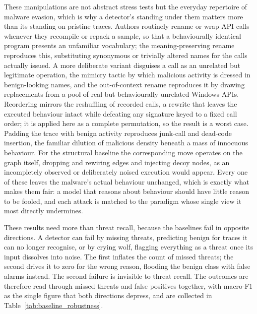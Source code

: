 \documentclass[%
    BCOR=10mm,
    DIV=13,
    toc=bibliography,
    toc=listof,
    oneside,
    12pt,
]{scrbook}
\begin{document}
These manipulations are not abstract stress tests but the everyday repertoire of malware
evasion, which is why a detector's standing under them matters more than its
standing on pristine traces. Authors routinely rename or wrap API calls whenever
they recompile or repack a sample, so that a behaviourally identical program
presents an unfamiliar vocabulary; the meaning-preserving rename reproduces this,
substituting synonymous or trivially altered names for the calls actually issued.
A more deliberate variant disguises a call as an unrelated but legitimate
operation, the mimicry tactic by which malicious activity is dressed in
benign-looking names, and the out-of-context rename reproduces it by drawing
replacements from a pool of real but behaviourally unrelated Windows APIs.
Reordering mirrors the reshuffling of recorded calls, a rewrite that leaves the
executed behaviour intact while defeating any signature keyed to a fixed call
order; it is applied here as a complete permutation, so the result is a worst
case. Padding the trace with benign activity
reproduces junk-call and dead-code insertion, the familiar dilution of malicious
density beneath a mass of innocuous behaviour. For the structural baseline the
corresponding move operates on the graph itself, dropping and rewiring edges and
injecting decoy nodes, as an incompletely observed or deliberately noised
execution would appear. Every one of these leaves the malware's actual behaviour
unchanged, which is exactly what makes them fair: a model that reasons about
behaviour should have little reason to be fooled, and each attack is matched to the
paradigm whose single view it most directly undermines.

These results need more than threat recall, because the baselines fail in
opposite directions. A detector can fail by missing threats, predicting
benign for traces it can no longer recognise, or by crying wolf, flagging
everything as a threat once its input dissolves into noise. The first inflates the
count of missed threats; the second drives it to zero for the wrong reason,
flooding the benign class with false alarms instead. The second failure is
invisible to threat recall. The outcomes are therefore read through missed threats
and false positives together, with macro-F1 as the single figure that both
directions depress, and are collected in Table~\ref{tab:baseline_robustness}.
\end{document}
